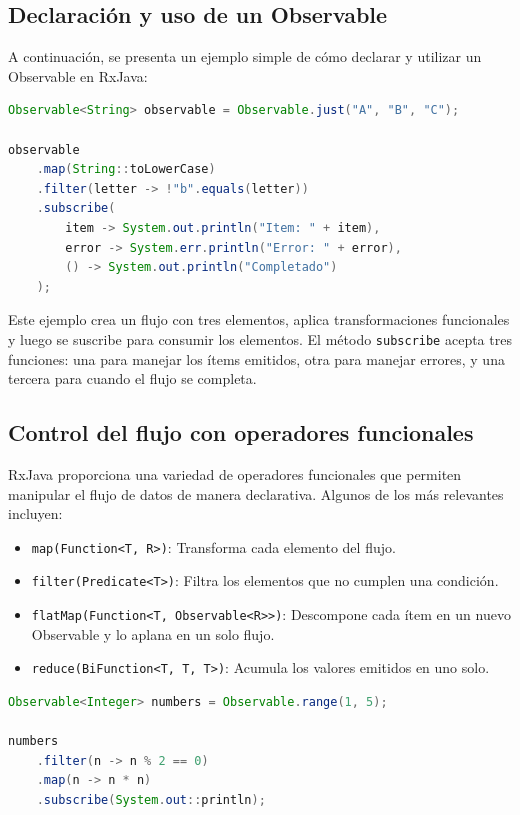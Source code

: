 \subsection{Declaración y uso de un Observable}

A continuación, se presenta un ejemplo simple de cómo declarar y utilizar un Observable en RxJava:

\begin{lstlisting}[language=Java, caption={Declaración de un Observable en RxJava}]
Observable<String> observable = Observable.just("A", "B", "C");

observable
    .map(String::toLowerCase)
    .filter(letter -> !"b".equals(letter))
    .subscribe(
        item -> System.out.println("Item: " + item),
        error -> System.err.println("Error: " + error),
        () -> System.out.println("Completado")
    );
\end{lstlisting}

Este ejemplo crea un flujo con tres elementos, aplica transformaciones funcionales y luego se suscribe para consumir los elementos. El método \texttt{subscribe} acepta tres funciones: una para manejar los ítems emitidos, otra para manejar errores, y una tercera para cuando el flujo se completa.

\subsection{Control del flujo con operadores funcionales}

RxJava proporciona una variedad de operadores funcionales que permiten manipular el flujo de datos de manera declarativa. Algunos de los más relevantes incluyen:

\begin{itemize}
    \item \texttt{map(Function<T, R>)}: Transforma cada elemento del flujo.
    \item \texttt{filter(Predicate<T>)}: Filtra los elementos que no cumplen una condición.
    \item \texttt{flatMap(Function<T, Observable<R>>)}: Descompone cada ítem en un nuevo Observable y lo aplana en un solo flujo.
    \item \texttt{reduce(BiFunction<T, T, T>)}: Acumula los valores emitidos en uno solo.
\end{itemize}

\begin{lstlisting}[language=Java, caption={Uso de operadores funcionales}]
Observable<Integer> numbers = Observable.range(1, 5);

numbers
    .filter(n -> n % 2 == 0)
    .map(n -> n * n)
    .subscribe(System.out::println);
\end{lstlisting}

